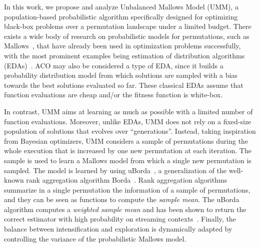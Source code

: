 \documentclass[sigconf,dvipsnames]{acmart}
\begin{document}
In this work, we propose and analyze Unbalanced Mallows Model (UMM), a
population-based probabilistic algorithm specifically designed for optimizing
black-box problems over a permutation landscape under a limited budget. There
exists a wide body of research on probabilistic models for permutations, such
as Mallows~\cite{FliVer1986}, that have already been  used in optimization
problems successfully, with the most prominent examples being estimation of
distribution algorithms
(EDAs)~\cite{CebIruMen2014eda}. ACO may also be considered
a type of EDA, since it builds a probability distribution model from which
solutions are sampled with a bias towards the best solutions evaluated so
far. These classical EDAs  assume that function
evaluations are cheap and/or the fitness function is white-box.%

In contrast, UMM aims at learning as much as possible with a limited number of
function evaluations. Moreover, unlike EDAs, UMM does not rely on a fixed-size
population of solutions that evolves over ``generations''. Instead, taking
inspiration from Bayesian optimizers, UMM considers a sample of permutations
during the whole execution that is increased by one new permutation at each
iteration. The sample is used to learn a Mallows model from which a single new
permutation is sampled. The model is learned by using
uBorda~\cite{IruLobPer2020arxiv}, a generalization of the well-known rank
aggregation algorithm Borda~\cite{AliMei2011kemeny}. Rank aggregation algorithms
summarize in a single permutation the information of a sample of permutations,
and they can be seen as functions to compute the \emph{sample mean}. The uBorda
algorithm computes a \textit{weighted sample mean} and has been shown to return
the correct estimator with high probability on streaming
contexts~\cite{IruLobPer2020arxiv}.
%
Finally, the balance between intensification and exploration is dynamically
adapted by controlling the variance of the probabilistic Mallows model.
\end{document}
